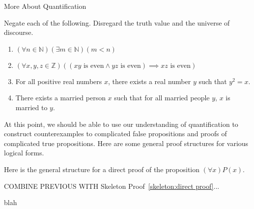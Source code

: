 \begin{section}{More About Quantification}
\begin{problem}
Negate each of the following.  Disregard the truth value and the universe of discourse.
\begin{enumerate}[label=\textrm{(\alph*)}]
\item $(\forall n\in\mathbb{N})(\exists m\in\mathbb{N})(m<n)$
\item $(\forall x,y,z\in\mathbb{Z})((xy \mbox{ is even}\wedge yz\mbox{ is even})\implies xz\mbox{ is even})$
\item For all positive real numbers $x$, there exists a real number $y$ such that $y^2=x$.
\item There exists a married person $x$ such that for all married people $y$, $x$ is married to $y$.
\end{enumerate}
\end{problem}

At this point, we should be able to use our understanding of quantification to construct counterexamples to complicated false propositions and proofs of complicated true propositions.  Here are some general proof structures for various logical forms.

\begin{skeleton}\label{skeleton:for all}
Here is the general structure for a direct proof of the proposition $(\forall x)P(x)$.

\begin{center}
\end{center}
\end{skeleton}

COMBINE PREVIOUS WITH Skeleton Proof~\ref{skeleton:direct proof}...

\begin{skeleton}\label{skeleton:for all direct proof}
blah	
\end{skeleton}


\end{section}
